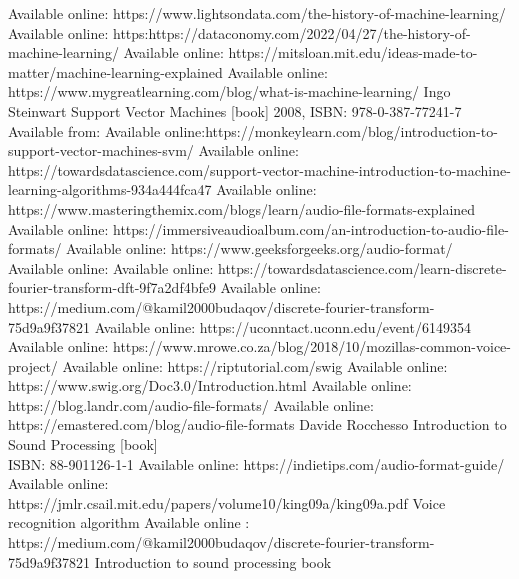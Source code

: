 \documentclass[english,12pt,oneside,a4paper]{article}
\begin{document}
	\begin{thebibliography}{15}
		Available online: https://www.lightsondata.com/the-history-of-machine-learning/
		Available online: https:https://dataconomy.com/2022/04/27/the-history-of-machine-learning/
		Available online: https://mitsloan.mit.edu/ideas-made-to-matter/machine-learning-explained
		Available online: https://www.mygreatlearning.com/blog/what-is-machine-learning/
		Ingo Steinwart Support Vector Machines [book] 2008, ISBN: 978-0-387-77241-7
		Available from: 
		Available online:https://monkeylearn.com/blog/introduction-to-support-vector-machines-svm/
		Available online: https://towardsdatascience.com/support-vector-machine-introduction-to-machine-learning-algorithms-934a444fca47
		Available online:
		https://www.masteringthemix.com/blogs/learn/audio-file-formats-explained
		Available online: 
		https://immersiveaudioalbum.com/an-introduction-to-audio-file-formats/
		Available online:
		https://www.geeksforgeeks.org/audio-format/
		Available online:
		Available online:
		https://towardsdatascience.com/learn-discrete-fourier-transform-dft-9f7a2df4bfe9
		Available online:
		https://medium.com/@kamil2000budaqov/discrete-fourier-transform-75d9a9f37821
		Available online:
		https://uconntact.uconn.edu/event/6149354
		Available online:
		https://www.mrowe.co.za/blog/2018/10/mozillas-common-voice-project/
		Available online:
		https://riptutorial.com/swig
		Available online:
		https://www.swig.org/Doc3.0/Introduction.html
		Available online:
		https://blog.landr.com/audio-file-formats/
		Available online:
		https://emastered.com/blog/audio-file-formats
		Davide Rocchesso Introduction to Sound Processing [book]\\ ISBN: 88-901126-1-1
		Available online: https://indietips.com/audio-format-guide/
		 Available online:
		 https://jmlr.csail.mit.edu/papers/volume10/king09a/king09a.pdf
		 Voice recognition algorithm
		 Available online : https://medium.com/@kamil2000budaqov/discrete-fourier-transform-75d9a9f37821
		Introduction to sound processing book

\end{thebibliography}
\end{document}
